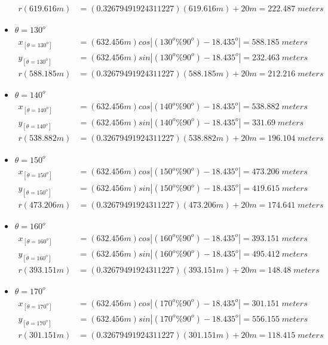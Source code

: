 \begin{itemize}
\begin{align*}
		r(619.616m) &=(0.32679491924311227)(619.616m)+20m  =222.487\;meters\end{align*}
\item $\theta=130^o$
	\begin{align*}%
		x_{[\theta=130^o]} &=(632.456m) cos\left| (130^o\%90^o) - 18.435^o \right|  =588.185\;meters \\
		y_{[\theta=130^o]} &=(632.456m) sin\left| (130^o\%90^o) - 18.435^o \right|  =232.463\;meters \\
		r(588.185m) &=(0.32679491924311227)(588.185m)+20m  =212.216\;meters\end{align*}
\item $\theta=140^o$
	\begin{align*}%
		x_{[\theta=140^o]} &=(632.456m) cos\left| (140^o\%90^o) - 18.435^o \right|  =538.882\;meters \\
		y_{[\theta=140^o]} &=(632.456m) sin\left| (140^o\%90^o) - 18.435^o \right|  =331.69\;meters \\
		r(538.882m) &=(0.32679491924311227)(538.882m)+20m  =196.104\;meters\end{align*}
\item $\theta=150^o$
	\begin{align*}%
		x_{[\theta=150^o]} &=(632.456m) cos\left| (150^o\%90^o) - 18.435^o \right|  =473.206\;meters \\
		y_{[\theta=150^o]} &=(632.456m) sin\left| (150^o\%90^o) - 18.435^o \right|  =419.615\;meters \\
		r(473.206m) &=(0.32679491924311227)(473.206m)+20m  =174.641\;meters\end{align*}
\item $\theta=160^o$
	\begin{align*}%
		x_{[\theta=160^o]} &=(632.456m) cos\left| (160^o\%90^o) - 18.435^o \right|  =393.151\;meters \\
		y_{[\theta=160^o]} &=(632.456m) sin\left| (160^o\%90^o) - 18.435^o \right|  =495.412\;meters \\
		r(393.151m) &=(0.32679491924311227)(393.151m)+20m  =148.48\;meters\end{align*}
\item $\theta=170^o$
	\begin{align*}%
		x_{[\theta=170^o]} &=(632.456m) cos\left| (170^o\%90^o) - 18.435^o \right|  =301.151\;meters \\
		y_{[\theta=170^o]} &=(632.456m) sin\left| (170^o\%90^o) - 18.435^o \right|  =556.155\;meters \\
		r(301.151m) &=(0.32679491924311227)(301.151m)+20m  =118.415\;meters\end{align*}
    \end{itemize}
    
